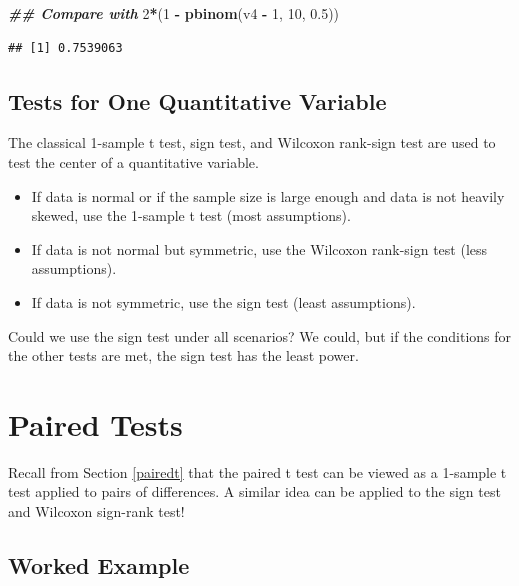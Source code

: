 \documentclass[
]{book}
\newenvironment{Shaded}{\begin{snugshade}}{\end{snugshade}}
\newcommand{\DecValTok}[1]{\textcolor[rgb]{0.00,0.00,0.81}{#1}}
\newcommand{\DocumentationTok}[1]{\textcolor[rgb]{0.56,0.35,0.01}{\textbf{\textit{#1}}}}
\newcommand{\FloatTok}[1]{\textcolor[rgb]{0.00,0.00,0.81}{#1}}
\newcommand{\FunctionTok}[1]{\textcolor[rgb]{0.13,0.29,0.53}{\textbf{#1}}}
\newcommand{\NormalTok}[1]{#1}
\newcommand{\SpecialCharTok}[1]{\textcolor[rgb]{0.81,0.36,0.00}{\textbf{#1}}}
\providecommand{\tightlist}{%
  \setlength{\itemsep}{0pt}\setlength{\parskip}{0pt}}
\theoremstyle{definition}
\theoremstyle{definition}
\theoremstyle{definition}
\theoremstyle{definition}
\theoremstyle{remark}
\begin{document}
\begin{Shaded}
\begin{Highlighting}[]
\DocumentationTok{\#\# Compare with}
\DecValTok{2}\SpecialCharTok{*}\NormalTok{(}\DecValTok{1} \SpecialCharTok{{-}} \FunctionTok{pbinom}\NormalTok{(v4 }\SpecialCharTok{{-}} \DecValTok{1}\NormalTok{, }\DecValTok{10}\NormalTok{, }\FloatTok{0.5}\NormalTok{))}
\end{Highlighting}
\end{Shaded}

\begin{verbatim}
## [1] 0.7539063
\end{verbatim}

\hypertarget{tests-for-one-quantitative-variable}{%
\subsection{Tests for One Quantitative Variable}\label{tests-for-one-quantitative-variable}}

The classical 1-sample t test, sign test, and Wilcoxon rank-sign test are used to test the center of a quantitative variable.

\begin{itemize}
\tightlist
\item
  If data is normal or if the sample size is large enough and data is not heavily skewed, use the 1-sample t test (most assumptions).
\item
  If data is not normal but symmetric, use the Wilcoxon rank-sign test (less assumptions).
\item
  If data is not symmetric, use the sign test (least assumptions).
\end{itemize}

Could we use the sign test under all scenarios? We could, but if the conditions for the other tests are met, the sign test has the least power.

\hypertarget{paired-tests}{%
\section{Paired Tests}\label{paired-tests}}

Recall from Section \ref{pairedt} that the paired t test can be viewed as a 1-sample t test applied to pairs of differences. A similar idea can be applied to the sign test and Wilcoxon sign-rank test!

\hypertarget{worked-example-5}{%
\subsection{Worked Example}\label{worked-example-5}}
\end{document}
